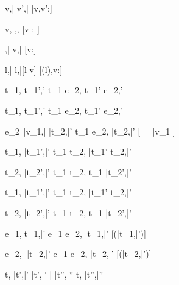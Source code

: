 

  { }
  {\Edit v,\bar{\sigma}  \Edit v',\bar{\sigma}}
  [v,v':\tau]

  { }
  {\Edit v,\sigma \handle{\Empty} \Enter \tau,\sigma,\True}
  [v : \tau]

  { }
  {\Enter \tau,\bar{\sigma}  \Edit v,\bar{\sigma}}
  [v:\tau]

  { }
  {\Update l,\bar{\sigma}  \Update l,\bar{\sigma}[l \mapsto v]}
  [\sigma(l),v:\tau]

  {t_1,\sigma {} t_1',\sigma'}
  {t_1 \Then e_2,\sigma {} t_1' \Then e_2,\sigma'}

  {t_1,\sigma {} t_1',\sigma'}
  {t_1 \Next e_2,\sigma {} t_1' \Next e_2,\sigma'}

  {e_2\ \bar{v_1},\sigma \bar{\normalise} \bar{t_2},\bar{\sigma'}}
  {t_1 \Next e_2,\sigma \xrightarrow[]{\Continue} \bar{t_2},\bar{\sigma'}}
  [ = \bar{v_1} \land \neg{}]


  {t_1,\sigma {} \bar{t_1'},\bar{\sigma'}}
  {t_1 \And t_2,\sigma {} \bar{t_1'} \And t_2,\bar{\sigma'}}

  {t_2,\sigma {} \bar{t_2'},\bar{\sigma'}}
  {t_1 \And t_2,\sigma {} t_1 \And \bar{t_2'},\bar{\sigma'}}


  {t_1,\sigma {} \bar{t_1'},\bar{\sigma'}}
  {t_1 \Or t_2,\sigma {} \bar{t_1'} \Or t_2,\bar{\sigma'}}

  {t_2,\sigma {} \bar{t_2'},\bar{\sigma'} }
  {t_1 \Or t_2,\sigma {} t_1 \Or \bar{t_2'},\bar{\sigma'}}


  {e_1,\sigma \normalise \bar{t_1},\bar{\sigma'}}
  {e_1 \Xor e_2,\sigma \xrightarrow[]{\Left} \bar{t_1},\bar{\sigma'}}
  [\neg\Failing(\bar{t_1},\bar{\sigma'})]

  {e_2,\sigma \bar{\normalise} \bar{t_2},\bar{\sigma'}}
  {e_1 \Xor e_2,\sigma \xrightarrow[]{\Right} \bar{t_2},\bar{\sigma'}}
  [\neg\Failing(\bar{t_2},\bar{\sigma'})]





  {t,\sigma {} \bar{t'},\bar{\sigma'} \Quad
   \bar{t'},\bar{\sigma'} \bar{\normalise} \bar{t''},\bar{\sigma''}}
  {t,\sigma {} \bar{t''},\bar{\sigma''}}
